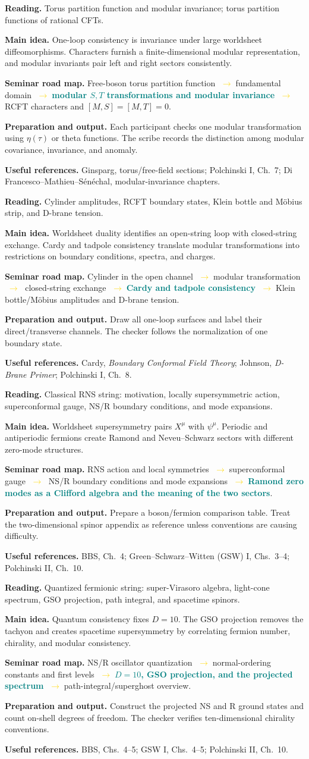 \documentclass[11pt]{article}
\newcommand{\essential}[1]{\textcolor{teal}{\textbf{#1}}}
\newcommand{\roadarrow}{\textcolor{gold}{\ensuremath{\;\longrightarrow\;}}}
\newcommand{\seminarweek}[7]{%
  \begin{tcolorbox}[
    enhanced,
    colback=white,colframe=navy,
    boxrule=0.65pt,arc=1.5mm,
    left=3mm,right=3mm,top=2mm,bottom=2mm,
    title={#1\hfill\normalfont #2},
    fonttitle=\bfseries,coltitle=white,colbacktitle=navy
  ]
  \textbf{Reading.} #3

  \textbf{Main idea.} #4

  \textbf{Seminar road map.} #5

  \textbf{Preparation and output.} #6

  \textbf{Useful references.} #7
  \end{tcolorbox}
}
\begin{document}
\seminarweek{Week 9}{Ch.~6.3--6.4, pp.~146--156}
{Torus partition function and modular invariance; torus partition functions of
rational CFTs.}
{One-loop consistency is invariance under large worldsheet diffeomorphisms.
Characters furnish a finite-dimensional modular representation, and modular
invariants pair left and right sectors consistently.}
{Free-boson torus partition function \roadarrow fundamental domain
\roadarrow \essential{modular $S,T$ transformations and modular invariance}
\roadarrow RCFT characters and $[M,S]=[M,T]=0$.}
{Each participant checks one modular transformation using $\eta(\tau)$ or theta
functions.  The scribe records the distinction among modular covariance,
invariance, and anomaly.}
{Ginsparg, torus/free-field sections; Polchinski I, Ch.~7; Di
Francesco--Mathieu--S\'en\'echal, modular-invariance chapters.}

\seminarweek{Week 10}{Ch.~6.5--6.8, pp.~157--174}
{Cylinder amplitudes, RCFT boundary states, Klein bottle and M\"obius strip,
and D-brane tension.}
{Worldsheet duality identifies an open-string loop with closed-string exchange.
Cardy and tadpole consistency translate modular transformations into restrictions
on boundary conditions, spectra, and charges.}
{Cylinder in the open channel \roadarrow modular transformation \roadarrow
closed-string exchange \roadarrow \essential{Cardy and tadpole consistency}
\roadarrow Klein bottle/M\"obius amplitudes and D-brane tension.}
{Draw all one-loop surfaces and label their direct/transverse channels.  The
checker follows the normalization of one boundary state.}
{Cardy, \emph{Boundary Conformal Field Theory}; Johnson, \emph{D-Brane Primer};
Polchinski I, Ch.~8.}

\seminarweek{Week 11}{Ch.~7, pp.~175--194}
{Classical RNS string: motivation, locally supersymmetric action,
superconformal gauge, NS/R boundary conditions, and mode expansions.}
{Worldsheet supersymmetry pairs $X^\mu$ with $\psi^\mu$.  Periodic and
antiperiodic fermions create Ramond and Neveu--Schwarz sectors with different
zero-mode structures.}
{RNS action and local symmetries \roadarrow superconformal gauge \roadarrow
NS/R boundary conditions and mode expansions \roadarrow \essential{Ramond zero
modes as a Clifford algebra and the meaning of the two sectors}.}
{Prepare a boson/fermion comparison table.  Treat the two-dimensional spinor
appendix as reference unless conventions are causing difficulty.}
{BBS, Ch.~4; Green--Schwarz--Witten (GSW) I, Chs.~3--4; Polchinski II, Ch.~10.}

\seminarweek{Week 12}{Ch.~8, pp.~195--222}
{Quantized fermionic string: super-Virasoro algebra, light-cone spectrum, GSO
projection, path integral, and spacetime spinors.}
{Quantum consistency fixes $D=10$.  The GSO projection removes the tachyon and
creates spacetime supersymmetry by correlating fermion number, chirality, and
modular consistency.}
{NS/R oscillator quantization \roadarrow normal-ordering constants and first
levels \roadarrow \essential{$D=10$, GSO projection, and the projected
spectrum} \roadarrow path-integral/superghost overview.}
{Construct the projected NS and R ground states and count on-shell degrees of
freedom.  The checker verifies ten-dimensional chirality conventions.}
{BBS, Chs.~4--5; GSW I, Chs.~4--5; Polchinski II, Ch.~10.}
\end{document}

